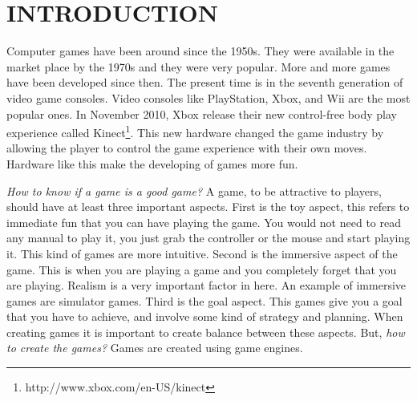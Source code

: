 \chapter{INTRODUCTION}








Computer games have been around since the 1950s\cite{computerVideoGamesHistory}. They were available in the market place by the 1970s and they were very popular. More and more games have been developed since then. The present time is in the seventh generation of video game consoles\cite{seventhGenerationGames}. Video consoles like PlayStation, Xbox, and Wii are the most popular ones. In November 2010, Xbox release their new control-free body play experience called Kinect\footnote{http://www.xbox.com/en-US/kinect}. This new hardware changed the game industry by allowing the player to control the game experience with their own moves. Hardware like this make the developing of games more fun. 

\textit{How to know if a game is a good game?} A game, to be attractive to players, should have at least three important aspects\cite{bookGameKit2}. First is the toy aspect, this refers to immediate fun that you can have playing the game. You would not need to read any manual to play it, you just grab the controller or the mouse and start playing it. This kind of games are more intuitive. Second is the immersive aspect of the game. This is when you are playing a game and you completely forget that you are playing. Realism is a very important factor in here. An example of immersive games are simulator games. Third is the goal aspect. This games give you a goal that you have to achieve, and involve some kind of strategy and planning. When creating games it is important to create balance between these aspects. But, \textit{how to create the games?} Games are created using game engines.

